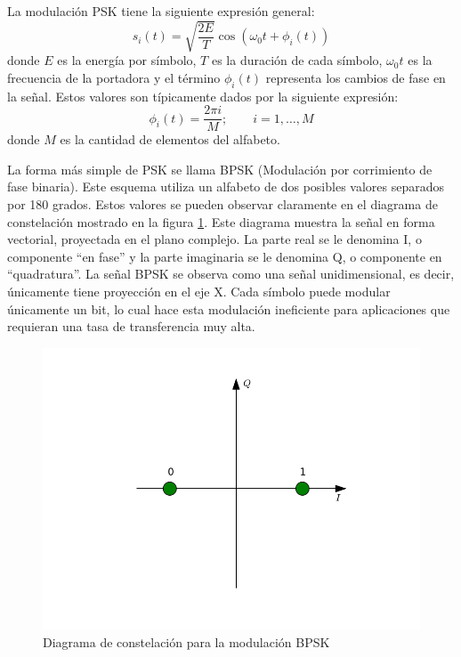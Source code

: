 La modulaci\'on PSK tiene la siguiente expresi\'on general:
\begin{equation}\label{eq:pskgen}
s_i(t)=\sqrt{\frac{2E}{T}}\cos(\omega_0t+\phi_i(t))
\end{equation}
donde $E$ es la energ\'ia por s\'imbolo, $T$ es la duraci\'on de cada s\'imbolo,
$\omega_0t$ es la frecuencia de la portadora y el t\'ermino $\phi_i(t)$
representa los cambios de fase en la se\~nal. Estos valores son t\'ipicamente
dados por la siguiente expresi\'on:
\begin{equation}\label{eq:levelfase}
\phi_i(t)=\frac{2\pi i}{M}; \qquad i=1,\ldots,M 
\end{equation}
donde $M$ es la cantidad de elementos del alfabeto.

La forma m\'as simple de PSK se llama BPSK (Modulaci\'on por corrimiento de fase binaria). Este esquema utiliza un alfabeto de
dos posibles valores separados por 180 grados. Estos valores se pueden observar
claramente en el diagrama de constelaci\'on mostrado en la figura
\ref{fig:bpskconst}. Este diagrama muestra la se\~nal en forma vectorial,
proyectada en el plano complejo. La parte real se le denomina I, o componente ``en fase'' y
la parte imaginaria se le denomina Q, o componente en ``quadratura''. La se\~nal
BPSK se observa como una se\~nal unidimensional, es decir, \'unicamente tiene
proyecci\'on en el eje X. Cada s\'imbolo puede modular \'unicamente un bit, lo
cual hace esta modulaci\'on ineficiente para aplicaciones que requieran una tasa
de transferencia muy alta.
\begin{figure}[hpt]
\centering
	\includegraphics[width=5.5in]{figs/bpsk}
	\caption{Diagrama de constelaci\'on para la modulaci\'on BPSK}
	\label{fig:bpskconst}
\end{figure}

